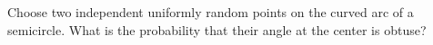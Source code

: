 Choose two independent uniformly random points on the curved arc of a semicircle. What is the probability that their angle at the center is obtuse?
